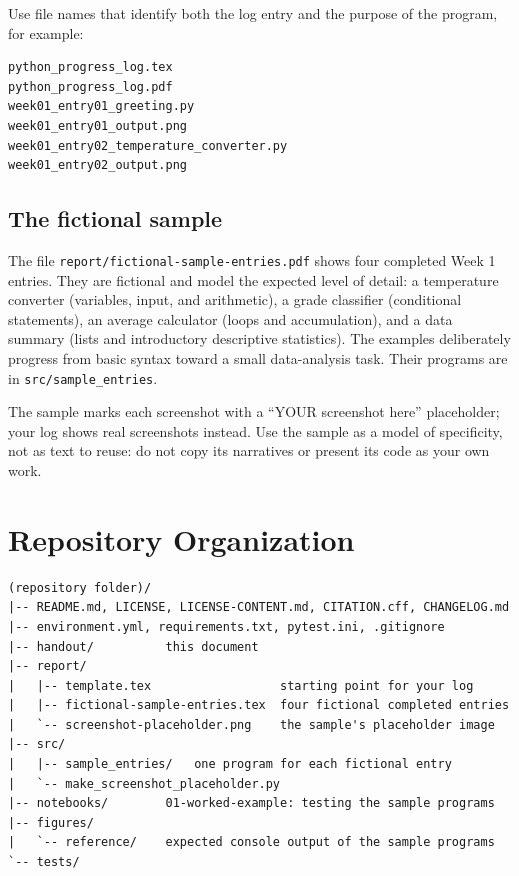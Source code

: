 \documentclass[11pt]{article}
\begin{document}
Use file names that identify both the log entry and the purpose of the program, for example:
\begin{lstlisting}[style=terminal]
python_progress_log.tex
python_progress_log.pdf
week01_entry01_greeting.py
week01_entry01_output.png
week01_entry02_temperature_converter.py
week01_entry02_output.png
\end{lstlisting}

\subsection{The fictional sample}
The file \texttt{report/fictional-sample-entries.pdf} shows four completed Week 1 entries. They are fictional and model the expected level of detail: a temperature converter (variables, input, and arithmetic), a grade classifier (conditional statements), an average calculator (loops and accumulation), and a data summary (lists and introductory descriptive statistics). The examples deliberately progress from basic syntax toward a small data-analysis task. Their programs are in \texttt{src/sample\_entries}.

The sample marks each screenshot with a ``YOUR screenshot here'' placeholder; your log shows real screenshots instead. Use the sample as a model of specificity, not as text to reuse: do not copy its narratives or present its code as your own work.

\section{Repository Organization}
\noindent\begin{minipage}{\linewidth}
\begin{lstlisting}[style=terminal]
(repository folder)/
|-- README.md, LICENSE, LICENSE-CONTENT.md, CITATION.cff, CHANGELOG.md
|-- environment.yml, requirements.txt, pytest.ini, .gitignore
|-- handout/          this document
|-- report/
|   |-- template.tex                  starting point for your log
|   |-- fictional-sample-entries.tex  four fictional completed entries
|   `-- screenshot-placeholder.png    the sample's placeholder image
|-- src/
|   |-- sample_entries/   one program for each fictional entry
|   `-- make_screenshot_placeholder.py
|-- notebooks/        01-worked-example: testing the sample programs
|-- figures/
|   `-- reference/    expected console output of the sample programs
`-- tests/
\end{lstlisting}
\end{minipage}
\end{document}
